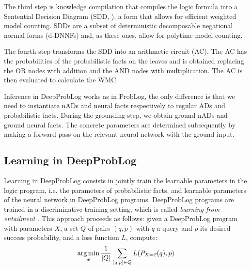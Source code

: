 The third step is knowledge compilation that compiles the logic formula into a Sentential Decision Diagram (SDD, \cite{SDD_Darwiche}), a form that allows for efficient weighted model counting. SDDs are a subset of deterministic decomposable negational normal forms (d-DNNFs) and, as these ones, allow for polytime model counting.

The fourth step transforms the SDD into an arithmetic circuit (AC). The AC has the probabilities of the probabilistic facts on the leaves and is obtained replacing the OR nodes with addition and the AND nodes with multiplication. The AC is then evaluated to calculate the WMC.

Inference in DeepProbLog works as in ProbLog, the only difference is that we need to instantiate nADs and neural facts respectively to regular ADs and probabilistic facts. During the grounding step, we obtain ground nADs and ground neural facts. The concrete parameters are determined subsequently by making a forward pass on the relevant neural network with the ground input.



\subsection{Learning in DeepProbLog}
Learning in DeepProbLog consists in jointly train the learnable parameters in the logic program, i.e. the parameters of probabilistic facts, and learnable parameters of the neural network in DeepProbLog programs.
DeepProbLog programs are trained in a discriminative training setting, which is called \textit{learning from entailment} \cite{Frazier}. This approach proceeds as follows: given a DeepProbLog program with parameters $X$, a set $Q$ of pairs $(q,p)$ with $q$ a query and $p$ its desired success probability, and a loss function $L$, compute:
\begin{equation}
    \operatorname*{arg\,min}_{\vec{x}} \frac{1}{|Q|} \sum_{(q,p) \in Q} L(P_{X=\vec{x}}(q), p)
\end{equation}

